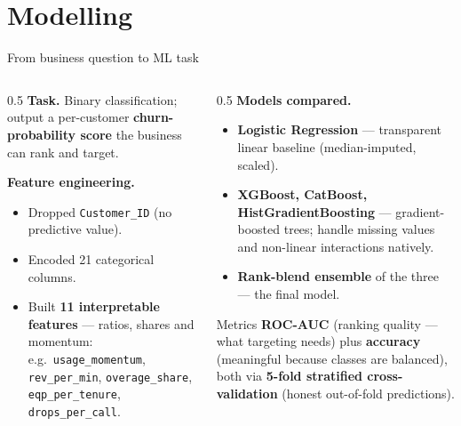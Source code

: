 \documentclass[aspectratio=169]{beamer}
\begin{document}
\section{Modelling}

\begin{frame}{From business question to ML task}
    \begin{columns}[T]
    \begin{column}{0.5\textwidth}
        \textbf{Task.} Binary classification; output a per-customer
        \textbf{churn-probability score} the business can rank and target.
        \vspace{0.5em}

        \textbf{Feature engineering.}
        \begin{itemize}\footnotesize
            \item Dropped \texttt{Customer\_ID} (no predictive value).
            \item Encoded 21 categorical columns.
            \item Built \textbf{11 interpretable features} --- ratios, shares
                  and momentum: e.g.\ \texttt{usage\_momentum},
                  \texttt{rev\_per\_min}, \texttt{overage\_share},
                  \texttt{eqp\_per\_tenure}, \texttt{drops\_per\_call}.
        \end{itemize}
    \end{column}
    \begin{column}{0.5\textwidth}
        \textbf{Models compared.}
        \begin{itemize}\footnotesize
            \item \textbf{Logistic Regression} --- transparent linear baseline
                  (median-imputed, scaled).
            \item \textbf{XGBoost, CatBoost, HistGradientBoosting} ---
                  gradient-boosted trees; handle missing values and non-linear
                  interactions natively.
            \item \textbf{Rank-blend ensemble} of the three --- the final model.
        \end{itemize}
        \vspace{0.3em}
        \begin{block}{Metrics}
            \footnotesize \textbf{ROC-AUC} (ranking quality --- what targeting
            needs) plus \textbf{accuracy} (meaningful because classes are
            balanced), both via \textbf{5-fold stratified cross-validation}
            (honest out-of-fold predictions).
        \end{block}
    \end{column}
    \end{columns}
\end{frame}
\end{document}
